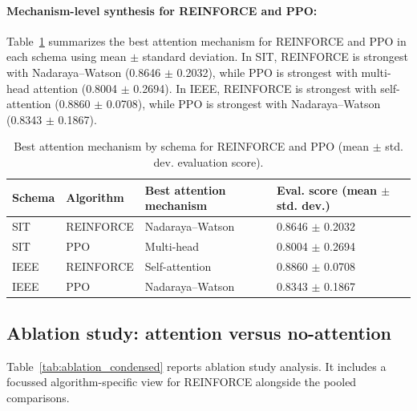 \paragraph{Mechanism-level synthesis for \textsc{REINFORCE} and \textsc{PPO}:}
Table~\ref{tab:best_mech_ppo_rf} summarizes the best attention mechanism for \textsc{REINFORCE} and \textsc{PPO} in each schema using mean $\pm$ standard deviation. In SIT, \textsc{REINFORCE} is strongest with Nadaraya--Watson (0.8646 $\pm$ 0.2032), while \textsc{PPO} is strongest with multi-head attention (0.8004 $\pm$ 0.2694). In IEEE, \textsc{REINFORCE} is strongest with self-attention (0.8860 $\pm$ 0.0708), while \textsc{PPO} is strongest with Nadaraya--Watson (0.8343 $\pm$ 0.1867).

\begin{table}[htbp]
\centering
	\caption{Best attention mechanism by schema for \textsc{REINFORCE} and \textsc{PPO} (mean $\pm$ std. dev. evaluation score).}
	\label{tab:best_mech_ppo_rf}
	\begin{tabular}{l l l l}
	\toprule
	\textbf{Schema} & \textbf{Algorithm} & \textbf{Best attention mechanism} & \textbf{Eval. score (mean $\pm$ std. dev.)}\\
	\midrule
	SIT & \textsc{REINFORCE} & Nadaraya--Watson & 0.8646 $\pm$ 0.2032\\
	SIT & \textsc{PPO} & Multi-head & 0.8004 $\pm$ 0.2694\\
	IEEE & \textsc{REINFORCE} & Self-attention & 0.8860 $\pm$ 0.0708\\
	IEEE & \textsc{PPO} & Nadaraya--Watson & 0.8343 $\pm$ 0.1867\\
	\bottomrule
	\end{tabular}
\end{table}


\subsection{Ablation study: attention versus no-attention} \label{sec:ablation_results} %

Table~\ref{tab:ablation_condensed} reports ablation study analysis. It includes a focussed algorithm-specific view for \textsc{REINFORCE} alongside the pooled comparisons.


